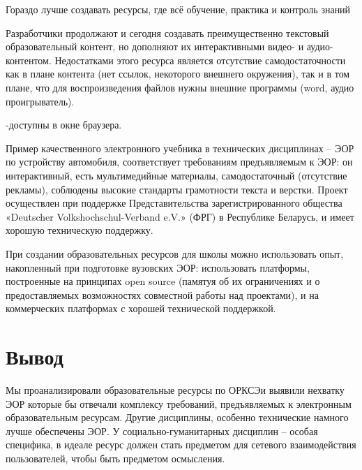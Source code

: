 Гораздо лучше создавать ресурсы, где всё обучение, практика и контроль знаний 

Разработчики продолжают и сегодня создавать преимущественно текстовый образовательный контент, но дополняют их интерактивными видео- и аудио- контентом\cite{opk}. Недостатками этого ресурса является отсутствие самодостаточности как в плане контента (нет ссылок, некоторого внешнего окружения), так и в том плане, что для воспроизведения файлов нужны внешние программы (word, аудио проигрыватель). 

-доступны в окне браузера.

Пример качественного электронного учебника в технических дисциплинах – ЭОР по устройству автомобиля\cite{automobile}, соответствует требованиям предъявляемым к ЭОР: он интерактивный, есть мультимедийные материалы, самодостаточный (отсутствие рекламы), соблюдены высокие стандарты грамотности текста и верстки. Проект осуществлен при поддержке Представительства зарегистрированного общества «Deutscher Volkshochschul-Verband e.V.» (ФРГ) в Республике Беларусь, и имеет хорошую техническую поддержку.

При создании образовательных ресурсов для школы можно использовать опыт, накопленный при подготовке вузовских ЭОР: использовать платформы, построенные на принципах open source (памятуя об их ограничениях и о предоставляемых возможностях совместной работы над проектами), и  на коммерческих платформах с хорошей технической поддержкой.



\section{Вывод}
 Мы проанализировали образовательные ресурсы по ОРКСЭи выявили нехватку ЭОР которые бы отвечали комплексу требований, предъявляемых к электронным образовательным ресурсам. Другие дисциплины, особенно технические намного лучше обеспечены ЭОР. У социально-гуманитарных дисциплин – особая специфика, в идеале ресурс должен стать предметом для сетевого взаимодействия пользователей, чтобы быть предметом осмысления.

